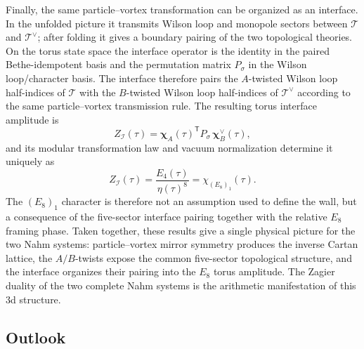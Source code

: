 \documentclass[11pt,a4paper]{article}
\numberwithin{equation}{section}
\begin{document}
Finally, the same particle--vortex transformation can be organized as an interface.  In the unfolded picture it transmits Wilson loop and monopole sectors between $\mathcal T$ and $\mathcal T^\vee$; after folding it gives a boundary pairing of the two topological theories.  On the torus state space the interface operator is the identity in the paired Bethe-idempotent basis and the permutation matrix $P_\sigma$ in the Wilson loop/character basis.  The interface therefore pairs the $A$-twisted Wilson loop half-indices of $\mathcal T$ with the $B$-twisted Wilson loop half-indices of $\mathcal T^\vee$ according to the same particle--vortex transmission rule.  The resulting torus interface amplitude is
\begin{equation}
  Z_{\mathcal I}(\tau)
  =\boldsymbol\chi_A(\tau)^{\mathsf T}
   P_\sigma\,
   \boldsymbol\chi_B^\vee(\tau),
  \label{eq:summary-interface-amplitude}
\end{equation}
and its modular transformation law and vacuum normalization determine it uniquely as
\begin{equation}
  Z_{\mathcal I}(\tau)
  =\frac{E_4(\tau)}{\eta(\tau)^8}
  =\chi_{(E_8)_1}(\tau).
  \label{eq:summary-E8-character}
\end{equation}
The $(E_8)_1$ character is therefore not an assumption used to define the wall, but a consequence of the five-sector interface pairing together with the relative $E_8$ framing phase.  Taken together, these results give a single physical picture for the two Nahm systems: particle--vortex mirror symmetry produces the inverse Cartan lattice, the $A/B$-twists expose the common five-sector topological structure, and the interface organizes their pairing into the $E_8$ torus amplitude.  The Zagier duality of the two complete Nahm systems is the arithmetic manifestation of this 3d structure.

\subsection{Outlook}
\end{document}
